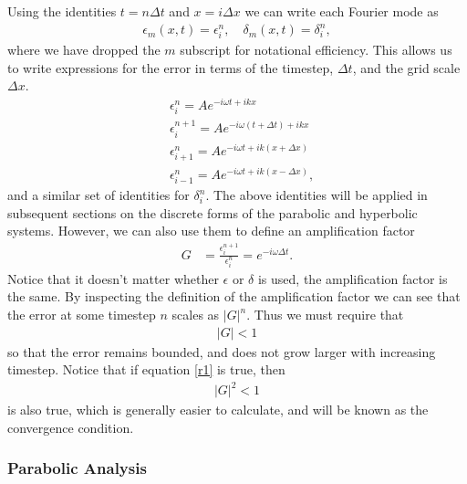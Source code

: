 \documentclass[iop]{emulateapj}
\begin{document}
			Using the identities $t = n \Delta t$ and $x = i \Delta x$ we can write each Fourier mode as
			\begin{align}
				\epsilon_m(x,t) = \epsilon_i^n, \quad \delta_m(x,t) = \delta_i^n,
			\end{align}
			where we have dropped the $m$ subscript for notational efficiency.
			This allows us to write expressions for the error in terms of the timestep, $\Delta t$, and the grid scale $\Delta x$.
			\begin{align}
				& \epsilon_i^n = A e^{-i \omega t + i k x} \label{e1} \\
				& \epsilon_i^{n+1} = A e^{-i \omega (t + \Delta t) + i k x} \label{e2} \\
				& \epsilon_{i + 1}^n = A e^{-i \omega t + i k (x + \Delta x)} \label{e3} \\
				& \epsilon_{i - 1}^n = A e^{-i \omega t + i k (x - \Delta x)} \label{e4} ,
			\end{align}
			and a similar set of identities for $\delta_i^n$.
			The above identities will be applied in subsequent sections on the discrete forms of the parabolic and hyperbolic systems.
			However, we can also use them to define an amplification factor
			\begin{align}
				G &= \frac{\epsilon_i^{n+1}}{\epsilon_i^n} =e^{-i \omega \Delta t}.
			\end{align}
			Notice that it doesn't matter whether $\epsilon$ or $\delta$ is used, the amplification factor is the same.
			By inspecting the definition of the amplification factor we can see that the error at some timestep $n$ scales as $|G|^n$.
			Thus we must require that
			\begin{align}
				|G| < 1 \label{r1}
			\end{align}
			so that the error remains bounded, and does not grow larger with increasing timestep.
			Notice that if equation \ref{r1} is true, then 
			\begin{align}
				|G|^2 < 1 \label{r2}
			\end{align}
			is also true, which is generally easier to calculate, and will be known as the convergence condition.
				
			\subsubsection{Parabolic Analysis}
			
\end{document}

